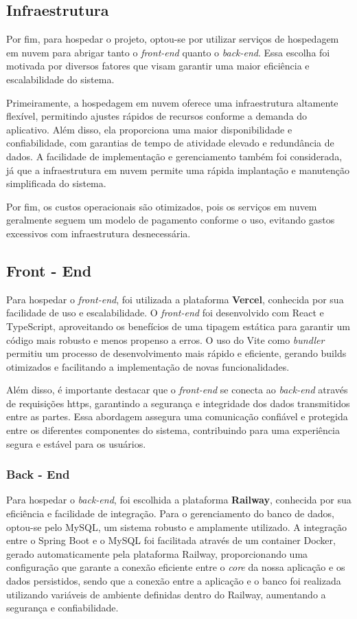 \subsection{Infraestrutura}
Por fim, para hospedar o projeto, optou-se por utilizar serviços de hospedagem em nuvem para abrigar tanto o \textit{front-end} quanto o \textit{back-end}. Essa escolha foi motivada por diversos fatores que visam garantir uma maior eficiência e escalabilidade do sistema.

Primeiramente, a hospedagem em nuvem oferece uma infraestrutura altamente flexível, permitindo ajustes rápidos de recursos conforme a demanda do aplicativo. Além disso, ela proporciona uma maior disponibilidade e confiabilidade, com garantias de tempo de atividade elevado e redundância de dados. A facilidade de implementação e gerenciamento também foi considerada, já que a infraestrutura em nuvem permite uma rápida implantação e manutenção simplificada do sistema.

Por fim, os custos operacionais são otimizados, pois os serviços em nuvem geralmente seguem um modelo de pagamento conforme o uso, evitando gastos excessivos com infraestrutura desnecessária.

\subsection{Front - End}
Para hospedar o \textit{front-end}, foi utilizada a plataforma \textbf{Vercel}, conhecida por sua facilidade de uso e escalabilidade. O \textit{front-end} foi desenvolvido com React e TypeScript, aproveitando os benefícios de uma tipagem estática para garantir um código mais robusto e menos propenso a erros. O uso do Vite como \textit{bundler} permitiu um processo de desenvolvimento mais rápido e eficiente, gerando builds otimizados e facilitando a implementação de novas funcionalidades. 

Além disso, é importante destacar que o \textit{front-end} se conecta ao \textit{back-end} através de requisições \ac{https}, garantindo a segurança e integridade dos dados transmitidos entre as partes. Essa abordagem assegura uma comunicação confiável e protegida entre os diferentes componentes do sistema, contribuindo para uma experiência segura e estável para os usuários.

\subsubsection{Back - End}
Para hospedar o \textit{back-end}, foi escolhida a plataforma \textbf{Railway}, conhecida por sua eficiência e facilidade de integração. Para o gerenciamento do banco de dados, optou-se pelo MySQL, um sistema robusto e amplamente utilizado. A integração entre o Spring Boot e o MySQL foi facilitada através de um container Docker, gerado automaticamente pela plataforma Railway, proporcionando uma configuração que garante a conexão eficiente entre o \textit{core} da nossa aplicação e os dados persistidos, sendo que a conexão entre a aplicação e o banco foi realizada utilizando variáveis de ambiente definidas dentro do Railway, aumentando a segurança e confiabilidade. 



